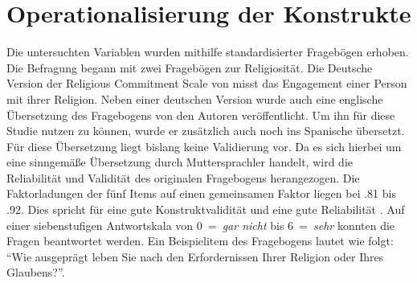 \section{Operationalisierung der Konstrukte}    \label{sec_3.3}
Die untersuchten Variablen wurden mithilfe standardisierter Fragebögen erhoben. Die Befragung begann mit zwei Fragebögen zur Religiosität. Die Deutsche Version der Religious Commitment Scale von \textcite{R_Commitment_Scale} misst das Engagement einer Person mit ihrer Religion. Neben einer deutschen Version wurde auch eine englische Übersetzung des Fragebogens von den Autoren veröffentlicht. Um ihn für diese Studie nutzen zu können, wurde er zusätzlich auch noch ins Spanische übersetzt. Für diese Übersetzung liegt bislang keine Validierung vor. Da es sich hierbei um eine sinngemäße Übersetzung durch Muttersprachler handelt, wird die Reliabilität und Validität des originalen Fragebogens herangezogen. Die Faktorladungen der fünf Items auf einen gemeinsamen Faktor liegen bei .81 bis .92. Dies spricht für eine gute Konstruktvalidität und eine gute Reliabilität \parencite{R_Commitment_Scale}. Auf einer siebenstufigen Antwortskala von 0~=~\textit{gar nicht} bis 6~=~\textit{sehr} konnten die Fragen beantwortet werden. Ein Beispielitem des Fragebogens lautet wie folgt: \enquote{Wie ausgeprägt leben Sie nach den Erfordernissen Ihrer Religion oder Ihres Glaubens?}.

